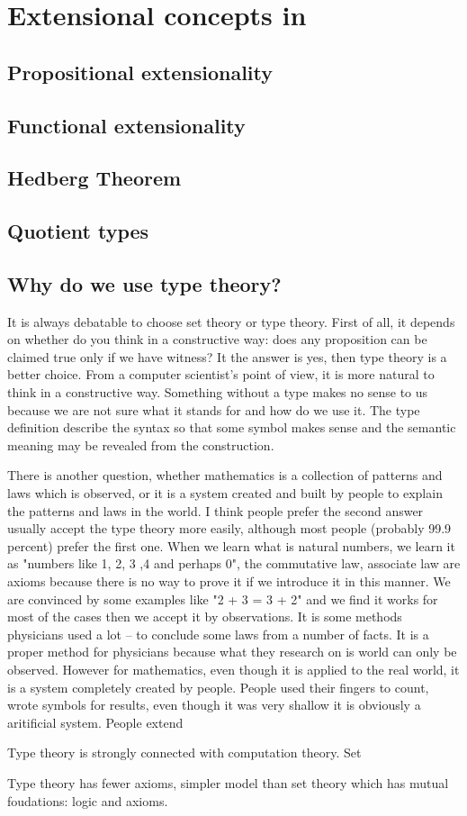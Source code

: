 \section{Extensional concepts in \itt}

\subsection{Propositional extensionality}

\subsection{Functional extensionality}


\subsection{Hedberg Theorem}

\subsection{Quotient types}




\subsection{Why do we use type theory?}

It is always debatable to choose set theory or type theory. First of all, it depends on whether do you think in a constructive way: does any proposition can be claimed true only if we have witness? It the answer is yes, then type theory is a better choice. From a computer scientist's point of view, it is more natural to think in a constructive way. Something without a type makes no sense to us because we are not sure what it stands for and how do we use it. The type definition describe the syntax so that some symbol makes sense and the semantic meaning may be revealed from the construction.

There is another question, whether mathematics is a collection of patterns and laws which is observed, or it is a system created and built by people to explain the patterns and laws in the world. I think people prefer the second answer usually accept the type theory more easily, although most people (probably 99.9 percent) prefer the first one. When we learn what is natural numbers, we learn it as "numbers like 1, 2, 3 ,4 and perhaps 0", the commutative law, associate law are axioms because there is no way to prove it if we introduce it in this manner. We are convinced by some examples like "2 + 3 = 3 + 2" and we find it works for most of the cases then we accept it by observations. It is some methods physicians used a lot -- to conclude some laws from a number of facts. It is a proper method for physicians because what they research on is world can only be observed. However for mathematics, even though it is applied to the real world, it is a system completely created by people. People used their fingers to count, wrote symbols for results, even though it was very shallow it is obviously a aritificial system. People extend 


Type theory is strongly connected with computation theory.
Set


Type theory has fewer axioms, simpler model than set theory which has mutual foudations: logic and axioms.